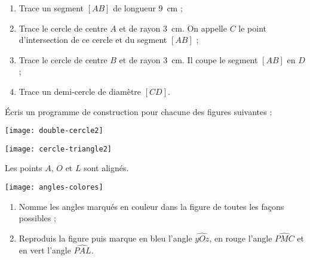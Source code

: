 \begin{exercice}
\begin{enumerate}
 \item Trace un segment $[AB]$ de longueur 9 cm ;
 \item Trace le cercle de centre $A$ et de rayon 3 cm. On appelle $C$ le point d'intersection de ce cercle et du segment $[AB]$ ;
 \item Trace le cercle de centre $B$ et de rayon 3 cm. Il coupe le segment $[AB]$ en $D$ ;
 \item Trace un demi‑cercle de diamètre $[CD]$.
 \end{enumerate}
\end{exercice}


\begin{exercice}
Écris un programme de construction pour chacune des figures suivantes :

\begin{colenumerate}{1}
 \item 
 
 \texttt{[image: double-cercle2]}
 \item 

\texttt{[image: cercle-triangle2]}
 \end{colenumerate}
\end{exercice}





\begin{exercice}
Les points $A$, $O$ et $L$ sont alignés.
 \begin{center} \texttt{[image: angles-colores]}  \end{center}
\begin{enumerate}
 \item Nomme les angles marqués en couleur dans la figure de toutes les façons possibles ; 
 \item Reproduis la figure puis marque en bleu l'angle $\widehat{yOz}$, en rouge l'angle $\widehat{PMC}$ et en vert l'angle $\widehat{PAL}$.
 \end{enumerate}
\end{exercice}


